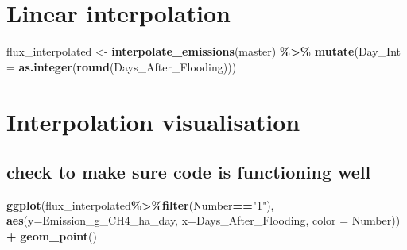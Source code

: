 \documentclass[
]{article}
\newenvironment{Shaded}{\begin{snugshade}}{\end{snugshade}}
\newcommand{\AttributeTok}[1]{\textcolor[rgb]{0.13,0.29,0.53}{#1}}
\newcommand{\CommentTok}[1]{\textcolor[rgb]{0.56,0.35,0.01}{\textit{#1}}}
\newcommand{\DecValTok}[1]{\textcolor[rgb]{0.00,0.00,0.81}{#1}}
\newcommand{\FunctionTok}[1]{\textcolor[rgb]{0.13,0.29,0.53}{\textbf{#1}}}
\newcommand{\NormalTok}[1]{#1}
\newcommand{\OtherTok}[1]{\textcolor[rgb]{0.56,0.35,0.01}{#1}}
\newcommand{\SpecialCharTok}[1]{\textcolor[rgb]{0.81,0.36,0.00}{\textbf{#1}}}
\newcommand{\StringTok}[1]{\textcolor[rgb]{0.31,0.60,0.02}{#1}}
\begin{document}
\begin{Shaded}
\end{Shaded}

\section{Linear interpolation}\label{linear-interpolation}

\begin{Shaded}
\begin{Highlighting}[]
\NormalTok{flux\_interpolated }\OtherTok{\textless{}{-}} \FunctionTok{interpolate\_emissions}\NormalTok{(master) }\SpecialCharTok{\%\textgreater{}\%} \FunctionTok{mutate}\NormalTok{(}\AttributeTok{Day\_Int =} \FunctionTok{as.integer}\NormalTok{(}\FunctionTok{round}\NormalTok{(Days\_After\_Flooding)))}
\end{Highlighting}
\end{Shaded}

\section{Interpolation visualisation}\label{interpolation-visualisation}

\subsection{check to make sure code is functioning
well}\label{check-to-make-sure-code-is-functioning-well}

\begin{Shaded}
\begin{Highlighting}[]
\FunctionTok{ggplot}\NormalTok{(flux\_interpolated}\SpecialCharTok{\%\textgreater{}\%}\FunctionTok{filter}\NormalTok{(Number}\SpecialCharTok{==}\StringTok{"1"}\NormalTok{), }\FunctionTok{aes}\NormalTok{(}\AttributeTok{y=}\NormalTok{Emission\_g\_CH4\_ha\_day, }\AttributeTok{x=}\NormalTok{Days\_After\_Flooding, }\AttributeTok{color =}\NormalTok{ Number)) }\SpecialCharTok{+} \FunctionTok{geom\_point}\NormalTok{()}
\end{Highlighting}
\end{Shaded}
\end{document}
